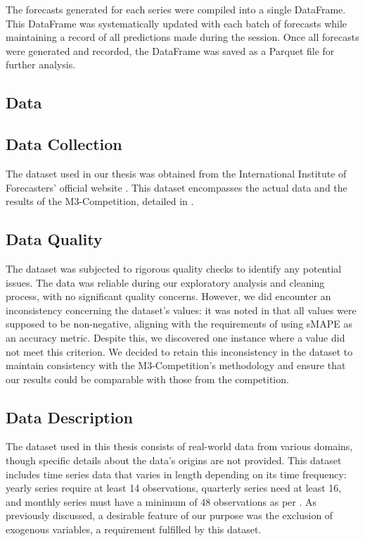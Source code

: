 \documentclass[12pt,a4paper]{article}
\begin{document}
The forecasts generated for each series were compiled into a single DataFrame. This DataFrame was systematically updated with each batch of forecasts while maintaining a record of all predictions made during the session. Once all forecasts were generated and recorded, the DataFrame was saved as a Parquet file for further analysis.


\begin{center}
  \section{Data}
\end{center}


\subsection{Data Collection}

The dataset used in our thesis was obtained from the International Institute of Forecasters' official website \parencite{IIF}. This dataset encompasses the actual data and the results of the M3-Competition, detailed in \parencite{MAKRIDAKIS2000}. 

\subsection{Data Quality}

The dataset was subjected to rigorous quality checks to identify any potential issues. The data was reliable during our exploratory analysis and cleaning process, with no significant quality concerns. However, we did encounter an inconsistency concerning the dataset's values: it was noted in \cite{MAKRIDAKIS2000} that all values were supposed to be non-negative, aligning with the requirements of using sMAPE as an accuracy metric. Despite this, we discovered one instance where a value did not meet this criterion. We decided to retain this inconsistency in the dataset to maintain consistency with the M3-Competition's methodology and ensure that our results could be comparable with those from the competition.

\subsection{Data Description} \label{data_description}

The dataset used in this thesis consists of real-world data from various domains, though specific details about the data's origins are not provided. This dataset includes time series data that varies in length depending on its time frequency: yearly series require at least 14 observations, quarterly series need at least 16, and monthly series must have a minimum of 48 observations as per \cite{MAKRIDAKIS2000}. As previously discussed, a desirable feature of our purpose was the exclusion of exogenous variables, a requirement fulfilled by this dataset. 
\end{document}

